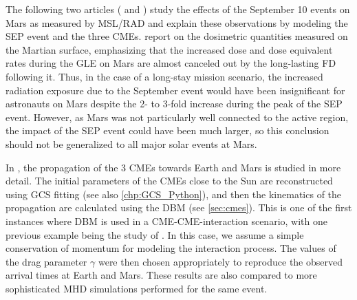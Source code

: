 The following two articles (\cite{Zeitlin-2018} and \cite{Guo-2018}) study the effects of the September 10 events on Mars as measured by \ac{MSL}/\ac{RAD} and explain these observations by modeling the \ac{SEP} event and the three \acp{CME}. \citet{Zeitlin-2018} report on the dosimetric quantities measured on the Martian surface, emphasizing that the increased dose and dose equivalent rates during the \ac{GLE} on Mars are almost canceled out by the long-lasting \ac{FD} following it. Thus, in the case of a long-stay mission scenario, the increased radiation exposure due to the September event would have been insignificant for astronauts on Mars despite the 2- to 3-fold increase during the peak of the \ac{SEP} event. However, as Mars was not particularly well connected to the active region, the impact of the \ac{SEP} event could have been much larger, so this conclusion should not be generalized to all major solar events at Mars.

In \citet{Guo-2018}, the propagation of the 3 \acp{CME} towards Earth and Mars is studied in more detail. The initial parameters of the \acp{CME} close to the Sun are reconstructed using \ac{GCS} fitting (see also \autoref{chp:GCS_Python}), and then the kinematics of the propagation are calculated using the \ac{DBM} (see \autoref{sec:cmes}). This is one of the first instances where \ac{DBM} is used in a \ac{CME}-\ac{CME}-interaction scenario, with one previous example being the study of \citet{Temmer-2012}. In this case, we assume a simple conservation of momentum for modeling the interaction process. The values of the drag parameter $\gamma$ were then chosen appropriately to reproduce the observed arrival times at Earth and Mars. These results are also compared to more sophisticated \ac{MHD} simulations performed for the same event.\\


